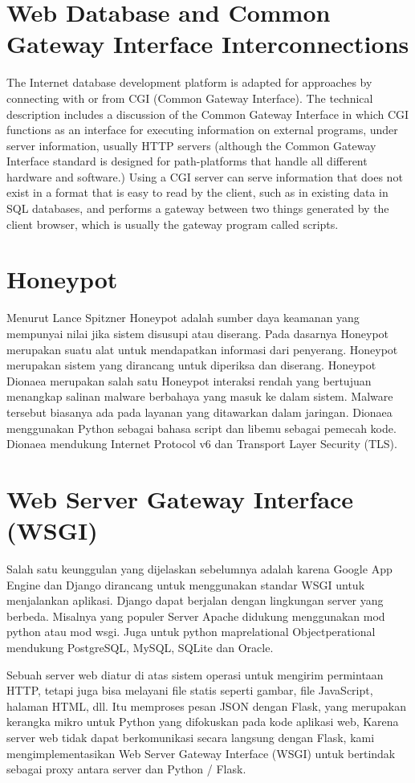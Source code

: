 \section{ Web Database and Common Gateway Interface Interconnections }
The Internet database development platform is adapted for approaches by connecting with or from CGI (Common Gateway Interface). The technical description includes a discussion of the Common Gateway Interface in which CGI functions as an interface for executing information on external programs, under server information, usually HTTP servers (although the Common Gateway Interface standard is designed for path-platforms that handle all different hardware and software.) Using a CGI server can serve information that does not exist in a format that is easy to read by the client, such as in existing data in SQL databases, and performs a gateway between two things generated by the client browser, which is usually the gateway program called scripts.


\section{Honeypot}
Menurut Lance Spitzner Honeypot adalah sumber daya keamanan yang mempunyai nilai jika sistem disusupi atau diserang. Pada dasarnya Honeypot merupakan suatu alat untuk mendapatkan informasi dari penyerang. Honeypot merupakan sistem yang dirancang untuk diperiksa dan diserang.
Honeypot Dionaea merupakan salah satu Honeypot interaksi rendah yang bertujuan menangkap salinan malware berbahaya yang masuk ke dalam sistem. Malware tersebut biasanya ada pada layanan yang ditawarkan dalam jaringan. Dionaea menggunakan Python sebagai bahasa script dan libemu sebagai pemecah kode. Dionaea mendukung Internet Protocol v6 dan Transport Layer Security (TLS)\cite{andros2015implementasi}.

\section{Web Server Gateway Interface (WSGI) }
Salah satu keunggulan yang dijelaskan sebelumnya adalah karena Google App Engine dan Django dirancang untuk menggunakan standar WSGI untuk menjalankan aplikasi.
Django dapat berjalan dengan lingkungan server yang berbeda. Misalnya yang populer Server Apache didukung menggunakan mod python atau mod wsgi.
Juga untuk python maprelational Objectperational mendukung PostgreSQL, MySQL, SQLite dan Oracle.

\par Sebuah server web diatur di atas sistem operasi untuk mengirim permintaan HTTP, tetapi juga bisa melayani file statis seperti gambar, file JavaScript, halaman HTML, dll.
 Itu memproses pesan JSON dengan Flask, yang merupakan kerangka mikro untuk Python yang difokuskan pada kode aplikasi web, Karena server web tidak dapat berkomunikasi
 secara langsung dengan Flask, kami mengimplementasikan Web Server Gateway Interface (WSGI) untuk bertindak sebagai proxy antara server dan Python / Flask.

